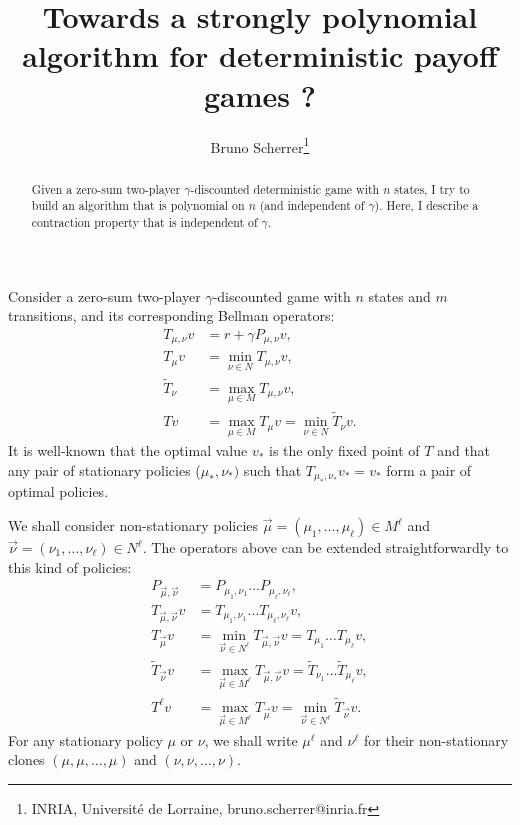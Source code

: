 \documentclass{article}
\title{Towards a strongly polynomial algorithm for deterministic payoff games ?}
\author{Bruno Scherrer\footnote{INRIA, Universit\'e de Lorraine, bruno.scherrer@inria.fr}}
\begin{document}
\maketitle

\begin{abstract}
  Given a zero-sum two-player $\gamma$-discounted deterministic game with $n$ states, I try to build an algorithm that is polynomial on $n$ (and independent of $\gamma$). Here, I describe a contraction property that is independent of $\gamma$.
\end{abstract}

Consider a zero-sum two-player $\gamma$-discounted game with $n$ states and $m$ transitions, and its corresponding Bellman operators:
\begin{align}
  T_{\mu,\nu}v & = r + \gamma P_{\mu,\nu}v, \\
  T_{\mu}v & = \min_{\nu \in N} T_{\mu,\nu}v, \\
  \tilde T_{\nu} & = \max_{\mu \in M} T_{\mu,\nu}v, \\
  Tv & = \max_{\mu \in M} T_{\mu}v = \min_{\nu \in N} \tilde T_{\nu}v.
\end{align}
It is well-known that the optimal value $v_*$ is the only fixed point of $T$ and that any pair of stationary policies ($\mu_*,\nu_*)$ such that $T_{\mu_*,\nu_*}v_*=v_*$ form a pair of optimal policies.

We shall consider non-stationary policies $\vec\mu = (\mu_1,\dots,\mu_\ell) \in M^\ell$ and $\vec\nu = (\nu_1,\dots,\nu_\ell) \in N^\ell$. The operators above can be extended straightforwardly to this kind of policies:
\begin{align}
  P_{\vec\mu,\vec\nu} &= P_{\mu_1,\nu_1} \dots P_{\mu_\ell,\nu_\ell}, \\
  T_{\vec\mu,\vec\nu} v &= T_{\mu_1,\nu_1} \dots T_{\mu_\ell,\nu_\ell} v, \\
  T_{\vec\mu} v &= \min_{\vec\nu \in N^\ell} T_{\vec\mu,\vec\nu} v = T_{\mu_1} \dots T_{\mu_\ell} v, \\
  \tilde T_{\vec\nu} v &= \max_{\vec\mu \in M^\ell} T_{\vec\mu,\vec\nu} v = \tilde T_{\nu_1} \dots \tilde T_{\mu_\ell} v, \\
  T^\ell v & = \max_{\vec\mu \in M^\ell} T_{\vec\mu}v = \min_{\vec\nu \in N^\ell} \tilde T_{\vec\nu}v.
\end{align}
For any stationary policy $\mu$ or $\nu$, we shall write $\mu^\ell$ and $\nu^\ell$ for their non-stationary clones $(\mu,\mu,\dots,\mu)$ and $(\nu,\nu,\dots,\nu)$.
\end{document}
